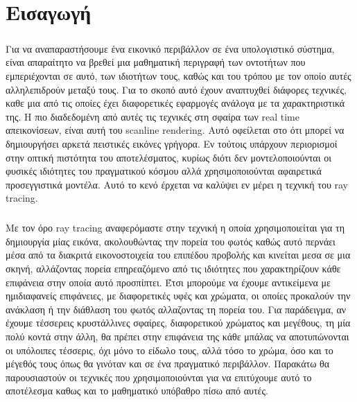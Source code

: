 \chapter{Εισαγωγή}

\ifpdf
    \graphicspath{{Introduction/IntroductionFigs/PNG/}{Introduction/IntroductionFigs/PDF/}{Introduction/IntroductionFigs/}}
\else
    \graphicspath{{Introduction/IntroductionFigs/EPS/}{Introduction/IntroductionFigs/}}
\fi

\begin{sloppypar}

\paragraph{}
Για να αναπαραστήσουμε ένα εικονικό περιβάλλον σε ένα υπολογιστικό σύστημα,
είναι απαραίτητο να βρεθεί μια μαθηματική περιγραφή των οντοτήτων που εμπεριέχονται σε αυτό, 
των ιδιοτήτων τους, καθώς και του τρόπου με τον οποίο αυτές αλληλεπιδρούν μεταξύ τους. 
Για το σκοπό αυτό έχουν αναπτυχθεί διάφορες τεχνικές, καθε μια από τις οποίες έχει διαφορετικές 
εφαρμογές ανάλογα με τα χαρακτηριστικά της. Η πιο διαδεδομένη από αυτές τις τεχνικές στη σφαίρα 
των real time απεικονίσεων, είναι αυτή του scanline rendering. Αυτό οφείλεται στο ότι μπορεί 
να δημιουργήσει αρκετά πειστικές εικόνες γρήγορα. Εν τούτοις υπάρχουν περιορισμοί στην οπτική 
πιστότητα του αποτελέσματος, κυρίως διότι δεν μοντελοποιούνται οι φυσικές ιδιότητες του πραγματικού 
κόσμου αλλά χρησιμοποιούνται αφαιρετικά προσεγγιστικά μοντέλα. Αυτό το κενό έρχεται να καλύψει 
εν μέρει η τεχνική του ray tracing.

\paragraph{}
Με τον όρο ray tracing αναφερόμαστε στην τεχνική η οποία χρησιμοποιείται για τη δημιουργία μίας
εικόνα, ακολουθώντας την πορεία του φωτός καθώς αυτό περνάει μέσα από τα διακριτά εικονοστοιχεία 
του επιπέδου προβολής και κινείται μεσα σε μια σκηνή, αλλάζοντας πορεία επηρεαζόμενο από τις 
ιδιότητες που χαρακτηρίζουν κάθε επιφάνεια στην οποία αυτό προσπίπτει. Έτσι μπορούμε να έχουμε 
αντικείμενα με ημιδιαφανείς επιφάνειες, με διαφορετικές υφές και χρώματα, οι οποίες προκαλούν 
την ανάκλαση ή την διάθλαση του φωτός αλλαζοντας τη πορεία του. Για παράδειγμα, αν έχουμε τέσσερεις 
κρυστάλλινες σφαίρες, διαφορετικού χρώματος και μεγέθους, τη μία πολύ κοντά στην άλλη, θα πρέπει 
στην επιφάνεια της κάθε μπάλας να αποτυπώνονται οι υπόλοιπες τέσσερις, όχι μόνο το είδωλο τους, 
αλλά τόσο το χρώμα, όσο και το μέγεθός τους όπως θα γινόταν και σε ένα πραγματικό περιβάλλον. 
Παρακάτω θα παρουσιαστούν οι τεχνικές που χρησιμοποιούνται για να επιτύχουμε αυτό το αποτέλεσμα 
καθως και το μαθηματικό υπόβαθρο πίσω από αυτές.

\end{sloppypar}
